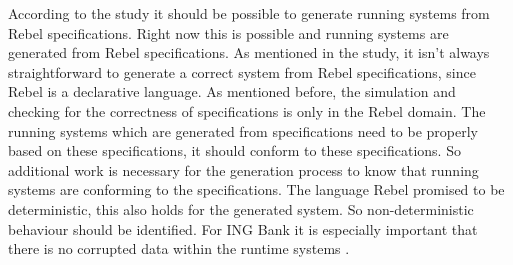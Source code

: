 
According to the study \cite[p.3]{stoelcase} it should be possible to generate running systems from Rebel specifications. Right now this is possible and running systems are generated from Rebel specifications. As mentioned in the study, it isn't always straightforward to generate a correct system from Rebel specifications, since Rebel is a declarative language. 
As mentioned before, the simulation and checking for the correctness of specifications is only in the Rebel domain. The running systems which are generated from specifications need to be properly based on these specifications, it should conform to these specifications. So additional work is necessary for the generation process to know that running systems are conforming to the specifications. The language Rebel promised to be deterministic, this also holds for the generated system. So non-deterministic behaviour should be identified. For ING Bank it is especially important that there is no corrupted data within the runtime systems .


